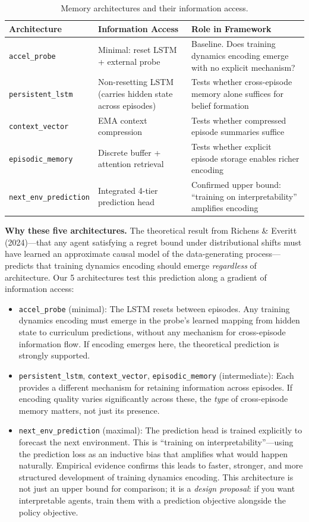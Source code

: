 \documentclass[11pt,a4paper]{article}
\theoremstyle{remark}
\begin{document}
\begin{table}[H]
\centering
\caption{Memory architectures and their information access.}
\begin{tabularx}{\textwidth}{l >{\raggedright\arraybackslash}p{4.5cm} X}
\toprule
\textbf{Architecture} & \textbf{Information Access} & \textbf{Role in Framework} \\
\midrule
\texttt{accel\_probe} & Minimal: reset LSTM + external probe & Baseline. Does training dynamics encoding emerge with no explicit mechanism? \\
\texttt{persistent\_lstm} & Non-resetting LSTM (carries hidden state across episodes) & Tests whether cross-episode memory alone suffices for belief formation \\
\texttt{context\_vector} & EMA context compression & Tests whether compressed episode summaries suffice \\
\texttt{episodic\_memory} & Discrete buffer + attention retrieval & Tests whether explicit episode storage enables richer encoding \\
\texttt{next\_env\_prediction} & Integrated 4-tier prediction head & Confirmed upper bound: ``training on interpretability'' amplifies encoding \\
\bottomrule
\end{tabularx}
\end{table}

\textbf{Why these five architectures.} The theoretical result from Richens \& Everitt (2024)---that any agent satisfying a regret bound under distributional shifts must have learned an approximate causal model of the data-generating process---predicts that training dynamics encoding should emerge \textit{regardless} of architecture. Our 5 architectures test this prediction along a gradient of information access:

\begin{itemize}[nosep]
    \item \texttt{accel\_probe} (minimal): The LSTM resets between episodes. Any training dynamics encoding must emerge in the probe's learned mapping from hidden state to curriculum predictions, without any mechanism for cross-episode information flow. If encoding emerges here, the theoretical prediction is strongly supported.
    \item \texttt{persistent\_lstm}, \texttt{context\_vector}, \texttt{episodic\_memory} (intermediate): Each provides a different mechanism for retaining information across episodes. If encoding quality varies significantly across these, the \textit{type} of cross-episode memory matters, not just its presence.
    \item \texttt{next\_env\_prediction} (maximal): The prediction head is trained explicitly to forecast the next environment. This is ``training on interpretability''---using the prediction loss as an inductive bias that amplifies what would happen naturally. Empirical evidence confirms this leads to faster, stronger, and more structured development of training dynamics encoding. This architecture is not just an upper bound for comparison; it is a \textit{design proposal}: if you want interpretable agents, train them with a prediction objective alongside the policy objective.
\end{itemize}
\end{document}
